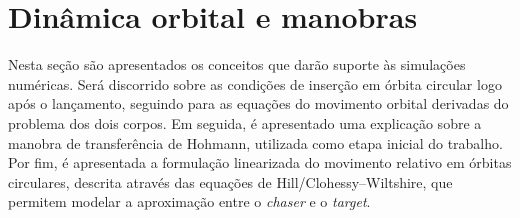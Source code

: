 \section{Dinâmica orbital e manobras}
Nesta seção são apresentados os conceitos que darão suporte às simulações numéricas. Será discorrido sobre as condições de inserção em órbita circular logo após o lançamento, seguindo para as equações do movimento orbital derivadas do problema dos dois corpos.
Em seguida, é apresentado uma explicação sobre a manobra de transferência de Hohmann, utilizada como etapa inicial do trabalho.
Por fim, é apresentada a formulação linearizada do movimento relativo em órbitas circulares, descrita através das equações de Hill/Clohessy--Wiltshire, que permitem modelar a aproximação entre o \emph{chaser} e o \emph{target}.




